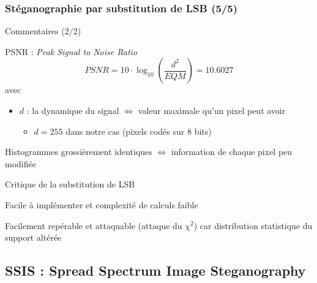 \documentclass{beamer}
\begin{document}
	
	\begin{frame}
	\frametitle{Stéganographie par substitution de LSB (5/5)}
	\begin{block}{Commentaires (2/2)}
   	\rightskip=0pt\leftskip=0pt
	\begin{itemize}
	 	{\footnotesize\item PSNR : \textit{Peak Signal to Noise Ratio}
	 	$$PSNR = 10\cdot \log_{10}\left(\frac{d^2}{EQM}\right) = 10.6027 $$
		avec \begin{itemize}
			\item $d$ : la dynamique du signal $\iff$ valeur maximale qu'un pixel peut avoir
				\begin{itemize}
					\item $d=255$ dans notre cas (pixels codés sur 8 bits)
				\end{itemize}
			\end{itemize}
		\item Histogrammes grossièrement identiques $\iff$ information de chaque pixel peu modifiée}
	\end{itemize}
	\end{block}
	
	\begin{alertblock}{Critique de la substitution de LSB}
   	\rightskip=0pt\leftskip=0pt
   		\begin{description}
   		{\small
   		\item[Avantage] Facile à implémenter et complexité de calculs faible
   		\item[Inconvénient] Facilement repérable et attaquable (attaque du $\chi^2$) car distribution statistique du support altérée
   		}
   		\end{description}
   	
   	\end{alertblock}
	\end{frame}

	
	\subsection{SSIS : Spread Spectrum Image Steganography}
	
\end{document}

